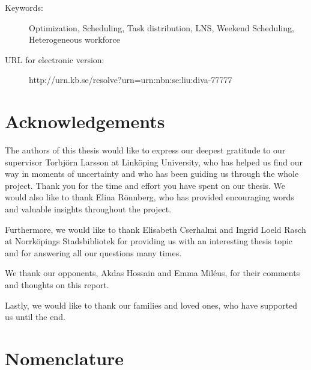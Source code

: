 \documentclass[a4paper, 10pt, twoside, openright]{book}
\newcommand{\putkeywords}[0]{%
Optimization, Scheduling, Task distribution, LNS, Weekend Scheduling, Heterogeneous workforce}
\begin{document}
\begin{description}
\item[Keywords:]{%
\putkeywords
}
\item[URL for electronic version: ]{\hfill%
\begin{center}
http://urn.kb.se/resolve?urn=urn:nbn:se:liu:diva-77777
\end{center}
}
\end{description}



\chapter*{Acknowledgements}

The authors of this thesis would like to express our deepest gratitude to our supervisor Torbjörn Larsson at Linköping University, who has helped us find our way in moments of uncertainty and who has been guiding us through the whole project. Thank you for the time and effort you have spent on our thesis. We would also like to thank Elina Rönnberg, who has provided encouraging words and valuable insights throughout the project.

Furthermore, we would like to thank Elisabeth Cserhalmi and Ingrid Loeld  Rasch at Norrköpings Stadsbibliotek for providing us with an interesting thesis topic and for answering all our questions many times.

We thank our opponents, Akdas Hossain and Emma Miléus, for their comments and thoughts on this report.

Lastly, we would like to thank our families and loved ones, who have supported us until the end. 



\chapter*{Nomenclature}
\end{document}
